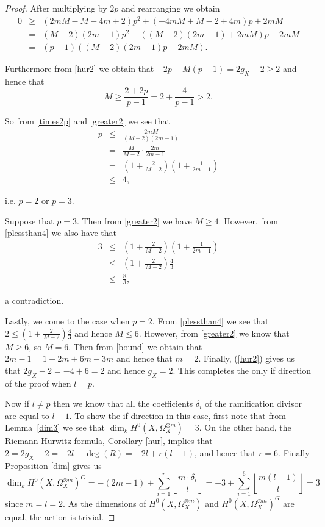 \begin{proof}
	After multiplying by $2p$ and rearranging we obtain
		\begin{eqnarray}\label{times2p}
			0 & \geq & (2mM-M-4m+2)p^2+(-4mM+M-2+4m)p+2mM \nonumber \\
			& = & (M-2)(2m-1)p^2-((M-2)(2m-1)+2mM)p+2mM \nonumber \\
			& = & (p-1)((M-2)(2m-1)p-2mM).
	\end{eqnarray}

	Furthermore from \eqref{hur2} we obtain that $-2p+M(p-1)=2g_X-2 \geq 2$ and hence that 
		\begin{equation}\label{greater2}
			M\geq \frac{2+2p}{p-1}=2+\frac{4}{p-1}>2.
		\end{equation}

	So from \eqref{times2p} and \eqref{greater2} we see that
		\begin{eqnarray}\label{plessthan4}
			p & \leq & \frac{2mM}{(M-2)(2m-1)}\nonumber\\
			& = & \frac{M}{M-2}\cdot\frac{2m}{2m-1}\nonumber\\
			& = & \left( 1+\frac{2}{M-2} \right) \left(1+\frac{1}{2m-1} \right)\\
			& \leq & 4, \nonumber	
		\end{eqnarray}

	i.e. $p=2$ or $p=3$. 

	Suppose that $p=3$. Then from \eqref{greater2} we have $M\geq 4$. However, from  \eqref{plessthan4} we also have that 
		\begin{eqnarray*}
			3 & \leq &\left( 1+\frac{2}{M-2} \right) \left(1+\frac{1}{2m-1} \right)\\
			& \leq & \left( 1+\frac{2}{M-2} \right) \frac{4}{3}\\
			& \leq & \frac{8}{3},
		\end{eqnarray*}

	a contradiction.

	Lastly, we come to the case when $p=2$. From \eqref{plessthan4} we see that $2\leq \left(1+\frac{2}{M-2}\right)\frac{4}{3}$ 
	and hence $M\leq 6$. However, from \eqref{greater2} we know that $M\geq 6$, so $M=6$. Then from \eqref{bound}  we obtain that $2m-1=1-2m+6m-3m$
	and hence that $m=2$. Finally, (\ref{hur2}) gives us that $2g_X-2=-4+6=2$ and hence $g_X=2$. 
	This completes the only if direction of the proof when $l=p$.

    Now if $l\neq p$ then we know that all the coefficients $\delta_i$ of the ramification divisor are equal to $l-1$. 
    To show the if direction in this case, first note that from Lemma~\ref{dim3} we see that $\dim_kH^0(X,\Omega_X^{\otimes m})=3$. 
    On the other hand, the Riemann-Hurwitz formula, Corollary \ref{hur}, implies that $2 = 2g_X-2=-2l+\deg(R)=-2l+r(l-1)$, and hence that $r=6$. 
    Finally Proposition \ref{dim} gives us
      \begin{equation*}
	\dim_kH^0(X,\Omega_X^{\otimes m})^G = -(2m-1) + \sum_{i=1}^r \left\lfloor \frac{m\cdot \delta_i}{l} \right\rfloor
	= -3 +\sum_{i=1}^6 \left\lfloor \frac{m(l-1)}{l} \right\rfloor
	= 3
      \end{equation*}
    since $m=l=2$.
    As the dimensions of $H^0(X,\Omega_X^{\otimes m})$ and $H^0(X,\Omega_X^{\otimes m})^G$ are equal, the action is trivial.



\end{proof}
